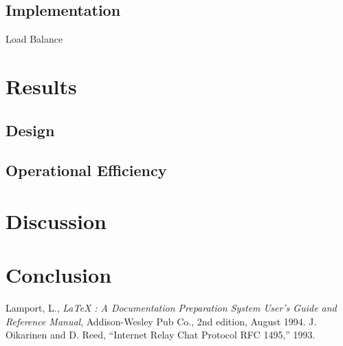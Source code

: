 \documentclass{article}
\begin{document}
\subsection{Implementation}
Load Balance
\section{Results}
\subsection{Design}
\subsection{Operational Efficiency}
\subsection{}

\section{Discussion}

\section{Conclusion}

\begin{thebibliography}{99}
 Lamport, L., {\it LaTeX : A Documentation
 Preparation System User's Guide and Reference Manual}, Addison-Wesley 
 Pub Co., 2nd edition, August 1994.
 J. Oikarinen and D. Reed, “Internet Relay Chat Protocol
RFC 1495,” 1993.
\end{thebibliography}
 
\end{document}
